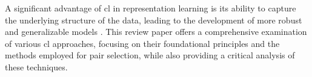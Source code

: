 
A significant advantage of \acl{cl} in representation learning is its ability to capture the underlying structure of the data, 
leading to the development of more robust and generalizable models \citet{mochi_2020}.
This review paper offers a comprehensive examination of various \acl{cl} approaches, 
focusing on their foundational principles and the methods employed for pair selection, 
while also providing a critical analysis of these techniques.